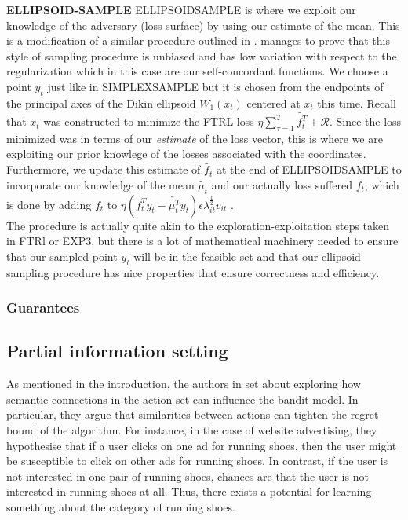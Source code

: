 \textbf{ELLIPSOID-SAMPLE}
ELLIPSOIDSAMPLE is where we exploit our knowledge of the adversary (loss surface) by using our estimate of the mean. This is a modification of a similar procedure outlined in \citep{abernethy}. \citep{abernathy} manages to  prove that this style of sampling procedure is unbiased and has low variation with respect to the regularization which in this case are our self-concordant functions. We choose a point $y_t$ just like in SIMPLEXSAMPLE but it is  chosen from the endpoints of the principal axes of the Dikin ellipsoid $W_1(x_t)$ centered at $x_t$ this time. Recall that $x_t$ was constructed to minimize the FTRL loss $\eta \sum_{\tau=1}^T\tilde{f_t^T} +\mathcal{R}$. Since the loss minimized was in terms of our \textit{estimate} of the loss vector, this is where we are exploiting our prior knowlege of the losses associated with the coordinates. Furthermore, we update this estimate of $\tilde{f_t}$ at the end of ELLIPSOIDSAMPLE to incorporate our knowledge of the mean $\tilde{\mu_t}$ and our actually loss suffered $f_t$, which is done by adding $f_t$ to  $\eta (f_{t}^Ty_t - \tilde{\mu_{t}^T}y_t)\epsilon \lambda_{it}^{\frac{1}{2}}v_{it}$ .\\

The procedure is actually quite akin to the exploration-exploitation steps taken in FTRl or EXP3, but there is a lot of mathematical machinery needed to ensure that our sampled point $y_t$ will be in the feasible set and that our ellipsoid sampling procedure has nice properties that ensure correctness and efficiency. 

\subsubsection{Guarantees}



\subsection{Partial information setting}
As mentioned in the introduction, the authors in \citep{alon} set about exploring how semantic connections in the action set can influence the bandit model. In particular, they argue that similarities between actions can tighten the regret bound of the algorithm. For instance, in the case of website advertising, they hypothesise that if a user clicks on one ad for running shoes, then the user might be susceptible to click on other ads for running shoes. In contrast, if the user is not interested in one pair of running shoes, chances are that the user is not interested in running shoes at all. Thus, there exists a potential for learning something about the category of running shoes. 

